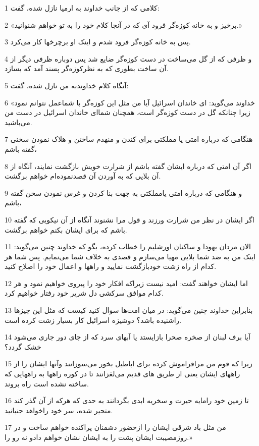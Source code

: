 \par 1 کلامی که از جانب خداوند به ارمیا نازل شده، گفت:
\par 2 «برخیز و به خانه کوزه‌گر فرود آی که در آنجا کلام خود را به تو خواهم شنوانید.»
\par 3 پس به خانه کوزه‌گر فرود شدم و اینک او برچرخها کار می‌کرد.
\par 4 و ظرفی که از گل می‌ساخت در دست کوزه‌گر ضایع شد پس دوباره ظرفی دیگر از آن ساخت بطوری که به نظرکوزه‌گر پسند آمد که بسازد.
\par 5 آنگاه کلام خداوندبه من نازل شده، گفت:
\par 6 «خداوند می‌گوید: ای خاندان اسرائیل آیا من مثل این کوزه‌گر با شماعمل نتوانم نمود زیرا چنانکه گل در دست کوزه‌گر است، همچنان شما‌ای خاندان اسرائیل در دست من می‌باشید.
\par 7 هنگامی که درباره امتی یا مملکتی برای کندن و منهدم ساختن و هلاک نمودن سخنی گفته باشم،
\par 8 اگر آن امتی که درباره ایشان گفته باشم از شرارت خویش بازگشت نمایند، آنگاه از آن بلایی که به آوردن آن قصدنموده‌ام خواهم برگشت.
\par 9 و هنگامی که درباره امتی یامملکتی به جهت بنا کردن و غرس نمودن سخن گفته باشم،
\par 10 اگر ایشان در نظر من شرارت ورزند و قول مرا نشنوند آنگاه از آن نیکویی که گفته باشم که برای ایشان بکنم خواهم برگشت.
\par 11 الان مردان یهودا و ساکنان اورشلیم را خطاب کرده، بگو که خداوند چنین می‌گوید: اینک من به ضد شما بلایی مهیا می‌سازم و قصدی به خلاف شما می‌نمایم. پس شما هر کدام از راه زشت خودبازگشت نمایید و راهها و اعمال خود را اصلاح کنید.
\par 12 اما ایشان خواهند گفت: امید نیست زیراکه افکار خود را پیروی خواهیم نمود و هر کدام موافق سرکشی دل شریر خود رفتار خواهیم کرد.
\par 13 بنابراین خداوند چنین می‌گوید: در میان امت‌ها سوال کنید کیست که مثل این چیزها راشنیده باشد؟ دوشیزه اسرائیل کار بسیار زشت کرده است.
\par 14 آیا برف لبنان از صخره صحرا بازایستد یا آبهای سرد که از جای دور جاری می‌شود خشک گردد؟
\par 15 زیرا که قوم من مرافراموش کرده برای اباطیل بخور می‌سوزانند وآنها ایشان را از راههای ایشان یعنی از طریق های قدیم می‌لغزانند تا در کوره راهها به راههایی که ساخته نشده است راه بروند.
\par 16 تا زمین خود رامایه حیرت و سخریه ابدی بگردانند به حدی که هر‌که از آن گذر کند متحیر شده، سر خود راخواهد جنبانید.
\par 17 من مثل باد شرقی ایشان را ازحضور دشمنان پراکنده خواهم ساخت و در روزمصیبت ایشان پشت را به ایشان نشان خواهم دادو نه رو را.»
